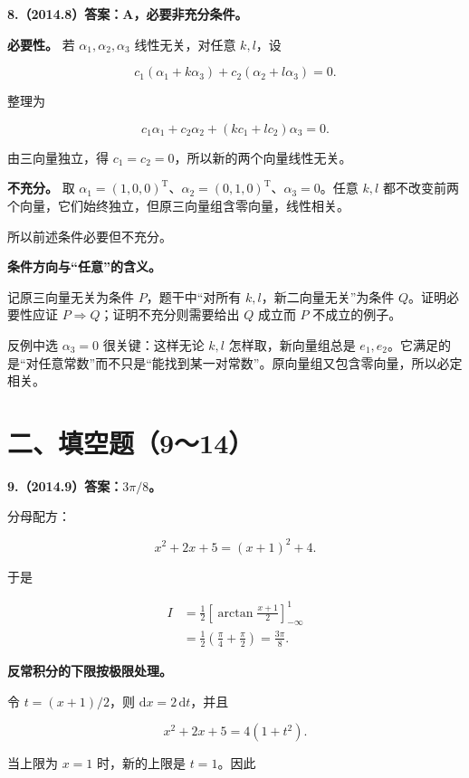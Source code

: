 \documentclass[UTF8,11pt,fontset=windows]{ctexart}
\begin{document}
\textbf{8.（2014.8）答案：A，必要非充分条件。}

\textbf{必要性。} 若 $\alpha_1,\alpha_2,\alpha_3$ 线性无关，对任意 $k,l$，设

$$
c_1(\alpha_1+k\alpha_3)+c_2(\alpha_2+l\alpha_3)=0.
$$

整理为

$$
c_1\alpha_1+c_2\alpha_2+(kc_1+lc_2)\alpha_3=0.
$$

由三向量独立，得 $c_1=c_2=0$，所以新的两个向量线性无关。

\textbf{不充分。} 取 $\alpha_1=(1,0,0)^{\mathrm T}$、$\alpha_2=(0,1,0)^{\mathrm T}$、$\alpha_3=0$。任意 $k,l$ 都不改变前两个向量，它们始终独立，但原三向量组含零向量，线性相关。

所以前述条件必要但不充分。

\textbf{条件方向与“任意”的含义。}

记原三向量无关为条件 $P$，题干中“对所有 $k,l$，新二向量无关”为条件 $Q$。证明必要性应证 $P\Rightarrow Q$；证明不充分则需要给出 $Q$ 成立而 $P$ 不成立的例子。

反例中选 $\alpha_3=0$ 很关键：这样无论 $k,l$ 怎样取，新向量组总是 $e_1,e_2$。它满足的是“对任意常数”而不只是“能找到某一对常数”。原向量组又包含零向量，所以必定相关。

\clearpage

\section*{二、填空题（9～14）}

\textbf{9.（2014.9）答案：$3\pi/8$。}

分母配方：

$$
x^2+2x+5=(x+1)^2+4.
$$

于是

$$
\begin{aligned}
I&=\frac12\left[\arctan\frac{x+1}{2}\right]_{-\infty}^{1}\\
&=\frac12\left(\frac\pi4+\frac\pi2\right)=\frac{3\pi}{8}.
\end{aligned}
$$

\textbf{反常积分的下限按极限处理。}

令 $t=(x+1)/2$，则 $\mathrm dx=2\,\mathrm dt$，并且

$$
x^2+2x+5=4(1+t^2).
$$

当上限为 $x=1$ 时，新的上限是 $t=1$。因此
\end{document}
